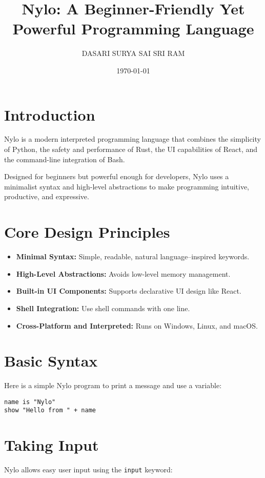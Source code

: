 \documentclass[12pt]{article}
\title{Nylo: A Beginner-Friendly Yet Powerful Programming Language}
\author{DASARI SURYA SAI SRI RAM}
\date{\today}
\begin{document}
\maketitle

\section*{Introduction}
Nylo is a modern interpreted programming language that combines the simplicity of Python, the safety and performance of Rust, the UI capabilities of React, and the command-line integration of Bash.

Designed for beginners but powerful enough for developers, Nylo uses a minimalist syntax and high-level abstractions to make programming intuitive, productive, and expressive.

\section*{Core Design Principles}
\begin{itemize}
  \item \textbf{Minimal Syntax:} Simple, readable, natural language–inspired keywords.
  \item \textbf{High-Level Abstractions:} Avoids low-level memory management.
  \item \textbf{Built-in UI Components:} Supports declarative UI design like React.
  \item \textbf{Shell Integration:} Use shell commands with one line.
  \item \textbf{Cross-Platform and Interpreted:} Runs on Windows, Linux, and macOS.
\end{itemize}

\section*{Basic Syntax}
Here is a simple Nylo program to print a message and use a variable:

\begin{lstlisting}[style=nylo, caption=Hello World in Nylo]
name is "Nylo"
show "Hello from " + name
\end{lstlisting}

\section*{Taking Input}
Nylo allows easy user input using the \texttt{input} keyword:
\end{document}
